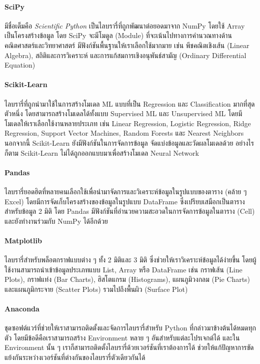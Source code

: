 \paragraph{SciPy} มีชื่อเต็มคือ \textit{Scientific Python} เป็นไลบรารี่ที่ถูกพัฒนาต่อยอดมาจาก NumPy โดยใช้ Array เป็นโครงสร้างข้อมูล โดย SciPy จะมีโมดูล (Module) ที่จะเน้นไปทางการคำนวณทางด้านคณิตศาสตร์และวิทยาศาสตร์ มีฟังก์ชันพื้นฐานให้เราเลือกใช้มากมาย เช่น พีชคณิตเชิงเส้น (Linear Algebra), สถิติและการวิเคราะห์ และการแก้สมการเชิงอนุพันธ์สามัญ (Ordinary Differential Equation) 

\paragraph{Scikit-Learn} ไลบรารี่ที่ถูกนำมาใช้ในการสร้างโมเดล ML แบบที่เป็น Regression และ Classification มากที่สุดตัวหนึ่ง โดยสามารถสร้างโมเดลได้ทั้งแบบ Supervised ML และ Unsupervised ML โดยมีโมเดลให้เราเลือกใช้งานหลายประเภท เช่น Linear Regression, Logistic Regression, Ridge Regression, Support Vector Machines, Random Forests และ Nearest Neighbors นอกจากนี้ Scikit-Learn ยังมีฟังก์ชันในการจัดการข้อมูล จัดแบ่งข้อมูลและวัดผลโมเดลด้วย อย่างไรก็ตาม Scikit-Learn ไม่ได้ถูกออกแบบมาเพื่อสร้างโมเดล Neural Network

\paragraph{Pandas} ไลบรารี่ยอดฮิตที่หลายคนเลือกใช้เพื่อนำมาจัดการและวิเคราะห์ข้อมูลในรูปแบบของตาราง (คล้าย ๆ Excel) โดยมีการจัดเก็บโครงสร้างของข้อมูลในรูปแบบ DataFrame ซึ่งเปรียบเสมือกเป็นตารางสำหรับข้อมูล 2 มิติ โดย Pandas มีฟังก์ชันที่อำนวยความสะอวดในการจัดการข้อมูลในตาราง (Cell) และยังทำงานร่วมกับ NumPy ได้อีกด้วย

\paragraph{Matplotlib} ไลบรารี่สำหรับพล็อตกราฟแบบต่าง ๆ ทั้ง 2 มิติและ 3 มิติ ซึ่งช่วยให้เราวิเคราะห์ข้อมูลได้ง่ายขึ้น โดยผู้ใช้งานสามารถนำเข้าข้อมูลประเภทแบบ List, Array หรือ DataFrame เช่น กราฟเส้น (Line Plots), กราฟแท่ง (Bar Charts), ฮิสโตแกรม (Histograms), แผนภูมิวงกลม (Pie Charts) และแผนภูมิกระจาย (Scatter Plots) รวมไปถึงพื้นผิว (Surface Plot)

\paragraph{Anaconda} ชุดซอฟต์แวร์ที่ช่วยให้เราสามารถติดตั้งและจัดการไลบรารี่สำหรับ Python ที่กล่าวมาข้างต้นได้หมดทุกตัว โดยมีข้อดีคือเราสามารถสร้าง Environment หลาย ๆ อันสำหรับแต่ละโปรเจกต์ได้ และใน Environment นั้น ๆ เราก็สามารถติดตั้งไลบรารี่ด้วยเวอร์ชันที่เราต้องการได้ ช่วยให้แก้ปัญหาการขัดแย้งกันระหว่างเวอร์ชันที่ต่างกันของไลบรารี่ตัวเดียวกันได้

